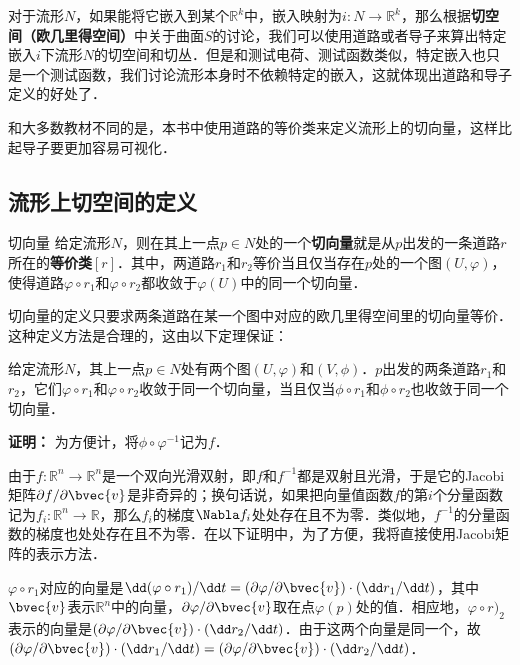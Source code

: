 
对于流形$N$，如果能将它嵌入到某个$\mathbb{R}^k$中，嵌入映射为$i:N\rightarrow\mathbb{R}^k$，那么根据\textbf{切空间（欧几里得空间）}中关于曲面$S$的讨论，我们可以使用道路或者导子来算出特定嵌入$i$下流形$N$的切空间和切丛．但是和测试电荷、测试函数类似，特定嵌入也只是一个测试函数，我们讨论流形本身时不依赖特定的嵌入，这就体现出道路和导子定义的好处了．

和大多数教材不同的是，本书中使用道路的等价类来定义流形上的切向量，这样比起导子要更加容易可视化．

\subsection{流形上切空间的定义}

\begin{definition}{切向量}
给定流形$N$，则在其上一点$p\in N$处的一个\textbf{切向量}就是从$p$出发的一条道路$r$所在的\textbf{等价类}$[r]$．其中，两道路$r_1$和$r_2$等价当且仅当存在$p$处的一个图$(U, \varphi)$，使得道路$\varphi\circ r_1$和$\varphi\circ r_2$都收敛于$\varphi(U)$中的同一个切向量．
\end{definition}

切向量的定义只要求两条道路在某一个图中对应的欧几里得空间里的切向量等价．这种定义方法是合理的，这由以下定理保证：

\begin{theorem}{}\label{tgSpa_the1}
给定流形$N$，其上一点$p\in N$处有两个图$(U, \varphi)$和$(V, \phi)$．$p$出发的两条道路$r_1$和$r_2$，它们$\varphi\circ r_1$和$\varphi\circ r_2$收敛于同一个切向量，当且仅当$\phi\circ r_1$和$\phi\circ r_2$也收敛于同一个切向量．
\end{theorem}

\textbf{证明：}
为方便计，将$\phi\circ\varphi^{-1}$记为$f$．

由于$f:\mathbb{R}^n\rightarrow\mathbb{R}^n$是一个双向光滑双射，即$f$和$f^{-1}$都是双射且光滑，于是它的Jacobi矩阵$\partial f/\partial \bvec{v}$是非奇异的；换句话说，如果把向量值函数$f$的第$i$个分量函数记为$f_i:\mathbb{R}^n\rightarrow\mathbb{R}$，那么$f_i$的梯度$\Nabla f_i$处处存在且不为零．类似地，$f^{-1}$的分量函数的梯度也处处存在且不为零．在以下证明中，为了方便，我将直接使用Jacobi矩阵的表示方法．

$\varphi\circ r_1$对应的向量是$\dd(\varphi\circ r_1)/\dd t=(\partial\varphi/\partial\bvec{v})\cdot(\dd r_1/\dd t)$，其中$\bvec{v}$表示$\mathbb{R}^n$中的向量，$\partial\varphi/\partial\bvec{v}$取在点$\varphi(p)$处的值．相应地，$\varphi\circ r)_2$表示的向量是$(\partial\varphi/\partial\bvec{v})\cdot(\dd r_2/\dd t)$．由于这两个向量是同一个，故$(\partial\varphi/\partial\bvec{v})\cdot(\dd r_1/\dd t)=(\partial\varphi/\partial\bvec{v})\cdot(\dd r_2/\dd t)$．

